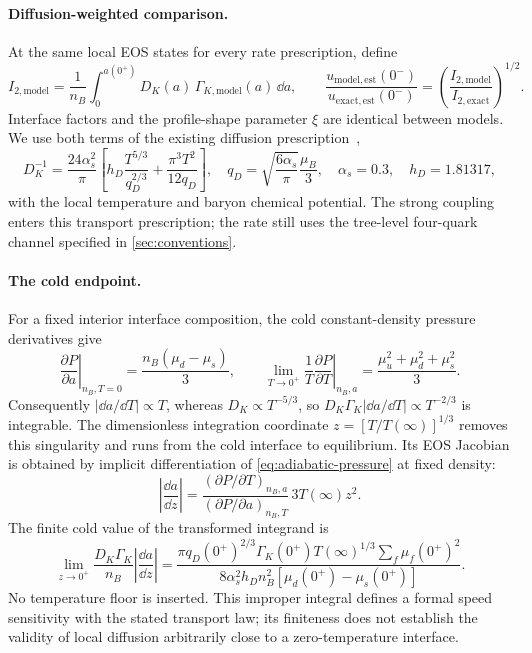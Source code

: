 \paragraph{Diffusion-weighted comparison.}
At the same local EOS states for every rate prescription, define
\begin{equation}
 I_{2,\mathrm{model}}=\frac1{n_B}\int_0^{a(0^+)}
 D_K(a)\,\Gamma_{K,\mathrm{model}}(a)\,\dd a,
 \qquad
 \frac{u_{\mathrm{model,est}}(0^-)}{u_{\mathrm{exact,est}}(0^-)}
 =\left(\frac{I_{2,\mathrm{model}}}{I_{2,\mathrm{exact}}}\right)^{1/2}.
 \label{eq:adiabatic-speed-ratio}
\end{equation}
Interface factors and the profile-shape parameter \(\xi\) are identical between models.
We use both terms of the existing diffusion prescription~\cite{Heiselberg:1993cr},
\begin{equation}
 D_K^{-1}=\frac{24\alpha_s^2}{\pi}
 \left[h_D\frac{T^{5/3}}{q_D^{2/3}}+\frac{\pi^3T^2}{12q_D}\right],
 \quad q_D=\sqrt{\frac{6\alpha_s}{\pi}}\frac{\mu_B}{3},
 \quad \alpha_s=0.3,\quad h_D=1.81317,
 \label{eq:adiabatic-diffusion}
\end{equation}
with the local temperature and baryon chemical potential.
The strong coupling enters this transport prescription; the rate still uses the tree-level four-quark channel specified in \cref{sec:conventions}.

\paragraph{The cold endpoint.}
For a fixed interior interface composition, the cold constant-density pressure derivatives give
\begin{equation}
 \left.\frac{\partial P}{\partial a}\right|_{n_B,T=0}
 =\frac{n_B(\mu_d-\mu_s)}3,
 \qquad
 \lim_{T\to0^+}\frac1T\left.\frac{\partial P}{\partial T}\right|_{n_B,a}
 =\frac{\mu_u^2+\mu_d^2+\mu_s^2}{3}.
 \label{eq:adiabatic-cold-derivatives}
\end{equation}
Consequently \(|\dd a/\dd T|\propto T\), whereas \(D_K\propto T^{-5/3}\), so \(D_K\Gamma_K|\dd a/\dd T|\propto T^{-2/3}\) is integrable.
The dimensionless integration coordinate \(z=[T/T(\infty)]^{1/3}\) removes this singularity and runs from the cold interface to equilibrium.
Its EOS Jacobian is obtained by implicit differentiation of \cref{eq:adiabatic-pressure} at fixed density:
\begin{equation}
 \left|\frac{\dd a}{\dd z}\right|
 =\frac{(\partial P/\partial T)_{n_B,a}}{(\partial P/\partial a)_{n_B,T}}
 \,3T(\infty)z^2.
 \label{eq:adiabatic-jacobian}
\end{equation}
The finite cold value of the transformed integrand is
\begin{equation}
 \lim_{z\to0^+}\frac{D_K\Gamma_K}{n_B}\left|\frac{\dd a}{\dd z}\right|
 =\frac{\pi q_D(0^+)^{2/3}\Gamma_K(0^+)T(\infty)^{1/3}
         \sum_f\mu_f(0^+)^2}
 {8\alpha_s^2h_D n_B^2[\mu_d(0^+)-\mu_s(0^+)]}.
 \label{eq:adiabatic-cold-integrand}
\end{equation}
No temperature floor is inserted.
This improper integral defines a formal speed sensitivity with the stated transport law; its finiteness does not establish the validity of local diffusion arbitrarily close to a zero-temperature interface.

